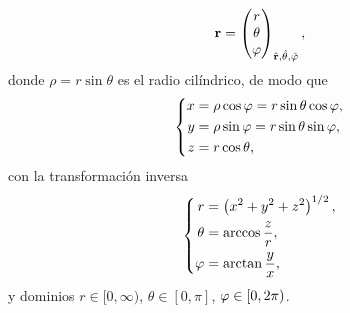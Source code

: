 \begin{equation}
  \label{eq:esfericas}
  \mathbf{r}=
  \begin{pmatrix}
    r\\\theta\\\varphi
  \end{pmatrix}_{\hat{\mathbf{r}},\hat{\mathbf{\theta}},\hat{\mathbf{\varphi}}},
\end{equation}
donde $\rho=r\sin\theta$ es el radio cil\'indrico, de modo que
\begin{equation}
  \label{eq:esfericas_directa}
  \left\{
  \begin{aligned}
    x&=\rho\cos\varphi=r\sin\theta\cos\varphi,\\
    y&=\rho\sin\varphi=r\sin\theta\sin\varphi,\\
    z&=r\cos\theta,
  \end{aligned}
  \right.
\end{equation}
con la transformaci\'on inversa
\begin{equation}
  \label{eq:esfericas_inversa}
  \left\{
  \begin{aligned}
    r&=\left( x^2+y^2+z^2 \right)^{1/2},\\
    \theta&=\arccos\frac{z}{r},\\
    \varphi&=\arctan\frac{y}{x},
  \end{aligned}
  \right.
\end{equation}
y dominios $r\in[0,\infty)$, $\theta\in[0,\pi]$, $\varphi\in[0,2\pi)$.
